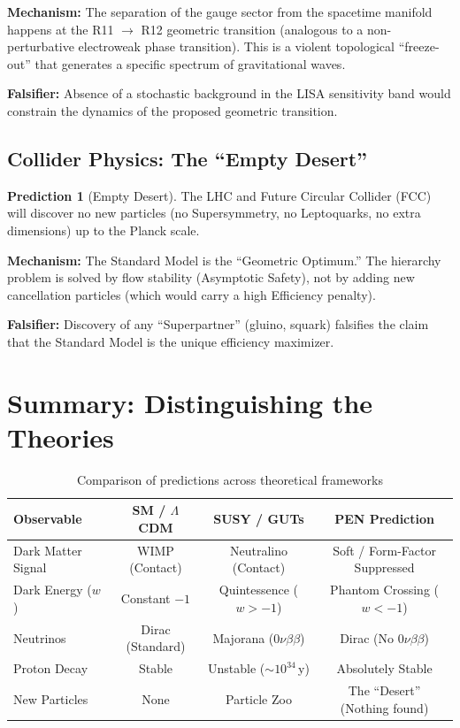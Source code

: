 \documentclass[11pt,a4paper]{article}
\theoremstyle{definition}
\newtheorem{prediction}{Prediction}
\theoremstyle{plain}
\theoremstyle{remark}
\begin{document}
\textbf{Mechanism:} The separation of the gauge sector from the spacetime manifold happens at the R11 $\to$ R12 geometric transition (analogous to a non-perturbative electroweak phase transition). This is a violent topological ``freeze-out'' that generates a specific spectrum of gravitational waves.

\textbf{Falsifier:} Absence of a stochastic background in the LISA sensitivity band would constrain the dynamics of the proposed geometric transition.

\subsection{Collider Physics: The ``Empty Desert''}

\begin{prediction}[Empty Desert]
The LHC and Future Circular Collider (FCC) will discover no new particles (no Supersymmetry, no Leptoquarks, no extra dimensions) up to the Planck scale.
\end{prediction}

\textbf{Mechanism:} The Standard Model is the ``Geometric Optimum.'' The hierarchy problem is solved by flow stability (Asymptotic Safety), not by adding new cancellation particles (which would carry a high Efficiency penalty).

\textbf{Falsifier:} Discovery of any ``Superpartner'' (gluino, squark) falsifies the claim that the Standard Model is the unique efficiency maximizer.

\section{Summary: Distinguishing the Theories}

\begin{table}[htbp]
\centering
\caption{Comparison of predictions across theoretical frameworks}
\label{tab:comparison}
\begin{tabular}{@{}l c c c@{}}
\toprule
\textbf{Observable} & \textbf{SM / $\Lambda$CDM} & \textbf{SUSY / GUTs} & \textbf{PEN Prediction} \\
\midrule
Dark Matter Signal & WIMP (Contact) & Neutralino (Contact) & Soft / Form-Factor Suppressed \\
Dark Energy ($w$) & Constant $-1$ & Quintessence ($w > -1$) & Phantom Crossing ($w < -1$) \\
Neutrinos & Dirac (Standard) & Majorana ($0\nu\beta\beta$) & Dirac (No $0\nu\beta\beta$) \\
Proton Decay & Stable & Unstable ($\sim 10^{34}$\,y) & Absolutely Stable \\
New Particles & None & Particle Zoo & The ``Desert'' (Nothing found) \\
\bottomrule
\end{tabular}
\end{table}
\end{document}
